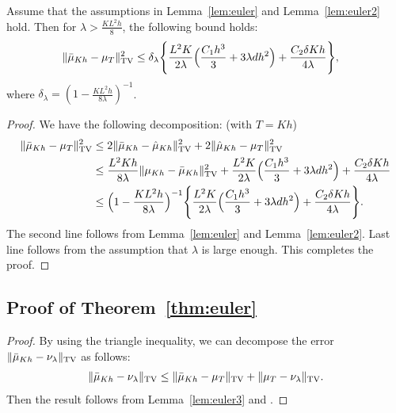 \begin{lemma}
\label{lem:euler3}
Assume that the assumptions in Lemma~\ref{lem:euler} and Lemma~\ref{lem:euler2} hold. Then for $\lambda > \frac{KL^2h}{8}$, the following bound holds:
\begin{align}
\|\bar{\mu}_{Kh} - \mu_{T} \|_{\textnormal{TV}}^2 &\leq \delta_\lambda \Biggl\{ \frac{L^2 K}{2\lambda} \Bigl( \frac{C_1 h^3}{3} + 3 \lambda d h^2 \Bigr) + \frac{C_2 \delta K h}{4\lambda} \Biggr\},
\end{align}
where $\delta_\lambda = (1 -\frac{KL^2h}{8\lambda})^{-1} $.
\end{lemma}
%
\begin{proof}
We have the following decomposition: (with $T= Kh$)
\begin{align}
\|\bar{\mu}_{Kh} - \mu_{T} \|_{\textnormal{TV}}^2 &\leq 2 \|\bar{\mu}_{Kh} - \hat{\mu}_{Kh} \|_{\textnormal{TV}}^2 + 2\|\hat{\mu}_{Kh} - \mu_{T} \|_{\textnormal{TV}}^2 \\
&\leq  \frac{L^2 K h}{8 \lambda}  \|\mu_{Kh} - \bar{\mu}_{Kh} \|_{\textnormal{TV}}^2 + \frac{L^2 K}{2\lambda} \Bigl( \frac{C_1 h^3}{3} + 3 \lambda d h^2 \Bigr) + \frac{C_2 \delta K h}{4\lambda} \\ 
&\leq \Bigl(1 -\frac{KL^2h}{8\lambda} \Bigr)^{-1} \Biggl\{ \frac{L^2 K}{2\lambda} \Bigl( \frac{C_1 h^3}{3} + 3 \lambda d h^2 \Bigr) + \frac{C_2 \delta K h}{4\lambda} \Biggr\}.
\end{align}
The second line follows from Lemma~\ref{lem:euler} and Lemma~\ref{lem:euler2}. Last line follows from the assumption that $\lambda$ is large enough. This completes the proof.
\end{proof}

\subsection{Proof of Theorem~\ref{thm:euler}}
%
\begin{proof}
By using the triangle inequality, we can decompose the error $\| \bar{\mu}_{Kh} - \nu_\lambda \|_{\textnormal{TV}}$ as follows:
\begin{align}
\| \bar{\mu}_{Kh} - \nu_\lambda \|_{\textnormal{TV}}\leq \| \bar{\mu}_{Kh} - \mu_{T} \|_{\textnormal{TV}} + \| \mu_{T} - \nu_\lambda \|_{\textnormal{TV}}.
\end{align}
Then the result follows from Lemma~\ref{lem:euler3} and .

\end{proof}

